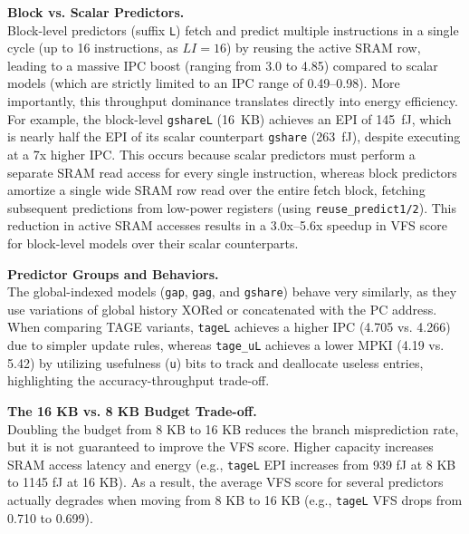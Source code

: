 \documentclass[11pt,a4paper,twocolumn]{article}
\begin{document}
\vspace{0.2cm}
\textbf{Block vs. Scalar Predictors.} \\
Block-level predictors (suffix \texttt{L}) fetch and predict multiple instructions in a single cycle (up to 16 instructions, as $LI=16$) by reusing the active SRAM row, leading to a massive IPC boost (ranging from 3.0 to 4.85) compared to scalar models (which are strictly limited to an IPC range of 0.49--0.98). More importantly, this throughput dominance translates directly into energy efficiency. For example, the block-level \texttt{gshareL} (16~KB) achieves an EPI of 145~fJ, which is nearly half the EPI of its scalar counterpart \texttt{gshare} (263~fJ), despite executing at a 7x higher IPC. This occurs because scalar predictors must perform a separate SRAM read access for every single instruction, whereas block predictors amortize a single wide SRAM row read over the entire fetch block, fetching subsequent predictions from low-power registers (using \texttt{reuse\_predict1/2}). This reduction in active SRAM accesses results in a 3.0x--5.6x speedup in VFS score for block-level models over their scalar counterparts.

\vspace{0.2cm}
\textbf{Predictor Groups and Behaviors.} \\
The global-indexed models (\texttt{gap}, \texttt{gag}, and \texttt{gshare}) behave very similarly, as they use variations of global history XORed or concatenated with the PC address. When comparing TAGE variants, \texttt{tageL} achieves a higher IPC (4.705 vs. 4.266) due to simpler update rules, whereas \texttt{tage\_uL} achieves a lower MPKI (4.19 vs. 5.42) by utilizing usefulness (\texttt{u}) bits to track and deallocate useless entries, highlighting the accuracy-throughput trade-off.

\vspace{0.2cm}
\textbf{The 16 KB vs. 8 KB Budget Trade-off.} \\
Doubling the budget from 8 KB to 16 KB reduces the branch misprediction rate, but it is not guaranteed to improve the VFS score. Higher capacity increases SRAM access latency and energy (e.g., \texttt{tageL} EPI increases from 939 fJ at 8 KB to 1145 fJ at 16 KB). As a result, the average VFS score for several predictors actually degrades when moving from 8 KB to 16 KB (e.g., \texttt{tageL} VFS drops from 0.710 to 0.699).
\end{document}
